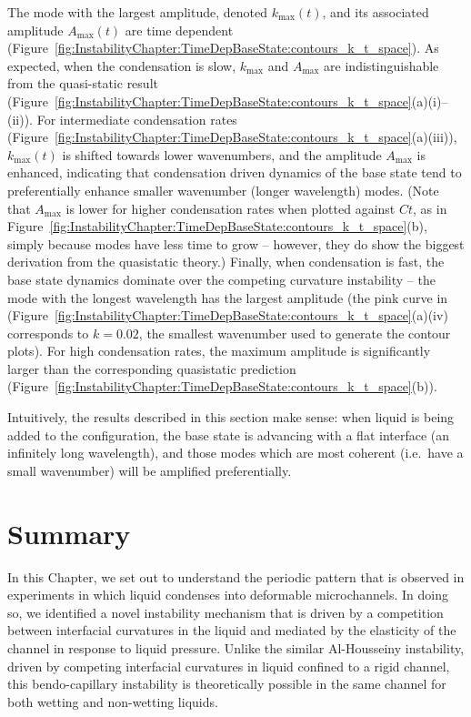 The mode with the largest amplitude, denoted $k_{\text{max}}(t)$, and its associated amplitude $A_{\text{max}}(t)$ are time dependent (Figure~\ref{fig:InstabilityChapter:TimeDepBaseState:contours_k_t_space}).
As expected, when the condensation is slow, $k_{\text{max}}$ and $A_{\text{max}}$ are indistinguishable from the quasi-static result (Figure~\ref{fig:InstabilityChapter:TimeDepBaseState:contours_k_t_space}(a)(i)--(ii)). For intermediate condensation rates (Figure~\ref{fig:InstabilityChapter:TimeDepBaseState:contours_k_t_space}(a)(iii)), $k_{\text{max}}(t)$ is shifted towards lower wavenumbers, and the amplitude $A_{\text{max}}$ is enhanced, indicating that condensation driven dynamics of the base state tend to preferentially enhance smaller wavenumber (longer wavelength) modes. (Note that $A_{\text{max}}$ is lower for higher condensation rates when plotted against $Ct$, as in Figure~\ref{fig:InstabilityChapter:TimeDepBaseState:contours_k_t_space}(b), simply because modes have less time to grow -- however, they do show the biggest derivation from the quasistatic theory.) Finally, when condensation is fast, the base state dynamics dominate over the competing curvature instability  -- the mode with the longest wavelength has the largest amplitude (the pink curve in (Figure~\ref{fig:InstabilityChapter:TimeDepBaseState:contours_k_t_space}(a)(iv) corresponds to $k = 0.02$, the smallest wavenumber used to generate the contour plots). For high condensation rates, the maximum amplitude is significantly larger than the corresponding quasistatic prediction  (Figure~\ref{fig:InstabilityChapter:TimeDepBaseState:contours_k_t_space}(b)).

Intuitively, the results described in this section make sense: when liquid is being added to the configuration, the base state is advancing with a flat interface (an infinitely long wavelength), and  those modes which are most coherent (i.e.~have a small wavenumber) will be amplified preferentially.

\section{Summary}
In this Chapter, we set out to understand the periodic pattern that is observed in experiments in which liquid condenses into deformable microchannels. In doing so, we identified a novel instability mechanism that is driven by a competition between interfacial curvatures in the liquid and mediated by the elasticity of the channel in response to liquid pressure. Unlike the similar Al-Housseiny instability, driven by competing interfacial curvatures in liquid confined to a rigid channel, this bendo-capillary instability is theoretically possible in the same channel for both wetting and non-wetting liquids.

